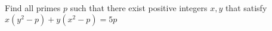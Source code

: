 Find all primes $p$ such that there exist positive integers $x,y$  that satisfy $x(y^2-p)+y(x^2-p)=5p$